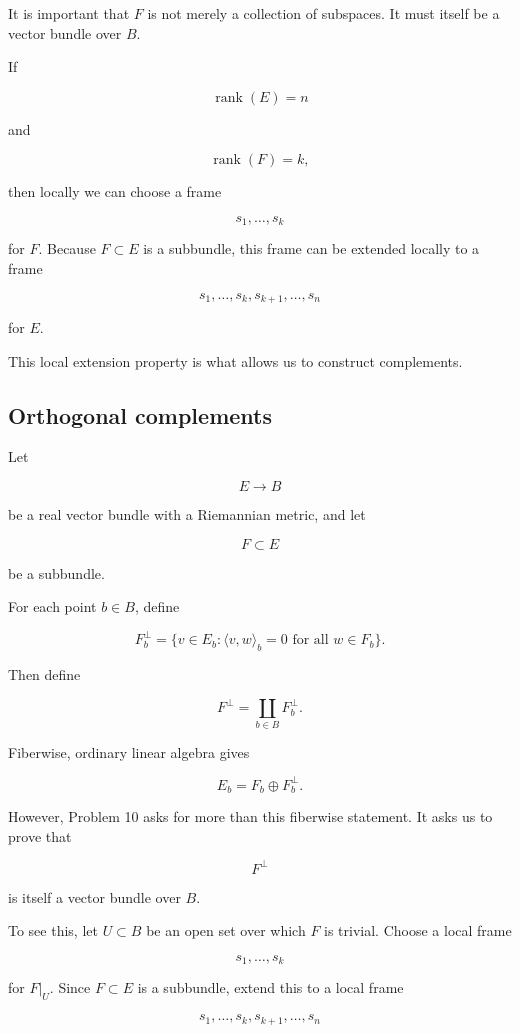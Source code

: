 \documentclass[12pt,a4paper]{article}
\DeclareMathOperator{\rank}{rank}
\theoremstyle{notespace}
\begin{document}
	It is important that \(F\) is not merely a collection of subspaces. It must itself be a vector bundle over \(B\).
	
	If
	
	\[
	\rank(E)=n
	\]
	
	and
	
	\[
	\rank(F)=k,
	\]
	
	then locally we can choose a frame
	
	\[
	s_1,\dots,s_k
	\]
	
	for \(F\). Because \(F\subset E\) is a subbundle, this frame can be extended locally to a frame
	
	\[
	s_1,\dots,s_k,s_{k+1},\dots,s_n
	\]
	
	for \(E\).
	
	This local extension property is what allows us to construct complements.
	
	\subsection{Orthogonal complements}
	
	Let
	
	\[
	E\to B
	\]
	
	be a real vector bundle with a Riemannian metric, and let
	
	\[
	F\subset E
	\]
	
	be a subbundle.
	
	For each point \(b\in B\), define
	
	\[
	F_b^{\perp}
	=
	\{v\in E_b:\langle v,w\rangle_b=0
	\text{ for all }w\in F_b\}.
	\]
	
	Then define
	
	\[
	F^{\perp}
	=
	\coprod_{b\in B}F_b^{\perp}.
	\]
	
	Fiberwise, ordinary linear algebra gives
	
	\[
	E_b=F_b\oplus F_b^{\perp}.
	\]
	
	However, Problem 10 asks for more than this fiberwise statement. It asks us to prove that
	
	\[
	F^{\perp}
	\]
	
	is itself a vector bundle over \(B\).
	
	To see this, let \(U\subset B\) be an open set over which \(F\) is trivial. Choose a local frame
	
	\[
	s_1,\dots,s_k
	\]
	
	for \(F|_U\). Since \(F\subset E\) is a subbundle, extend this to a local frame
	
	\[
	s_1,\dots,s_k,s_{k+1},\dots,s_n
	\]
	
\end{document}
